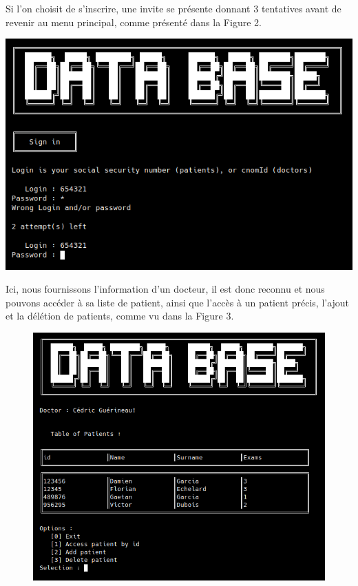 \documentclass[12pt,a4paper]{article}
\newenvironment{Figure}
{\par\medskip\noindent\minipage{\linewidth}}
{\endminipage\par\medskip}
\begin{document}
\begin{multicols}{2}
		Si l'on choisit de s'inscrire, une invite se présente donnant 3 tentatives avant de revenir au menu principal, comme présenté dans la Figure 2.
				

		\begin{Figure}
			\centering
			\includegraphics[width=\linewidth]{images/walkthrough/sign_in.png}
			\label{fig:page_connexion}
		\end{Figure}		

		Ici, nous fournissons l'information d'un docteur, il est donc reconnu et nous pouvons accéder à sa liste de patient, ainsi que l'accès à un patient précis, l'ajout et la délétion de patients, comme vu dans la Figure 3.
					

		\begin{figure}
			\centering
			\includegraphics[width=\linewidth]{images/walkthrough/doctor_main.png}
			\label{fig:menu_docteur}
		\end{figure}
				

\end{multicols}
\end{document}

